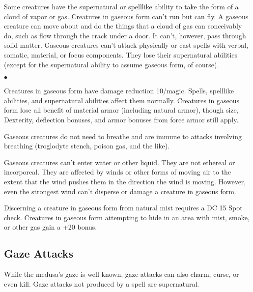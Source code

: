 Some creatures have the supernatural or spell\textendash like ability to take the form of a cloud of vapor or gas.
Creatures in gaseous form can't run but can fly. A gaseous creature can move about and do the things that a cloud of gas can conceivably do, such as flow through the crack under a door. It can't, however, pass through solid matter. Gaseous creatures can't attack physically or cast spells with verbal, somatic, material, or focus components. They lose their supernatural abilities (except for the supernatural ability to assume gaseous form, of course).

\begin{list}{$\bullet$}{\itemspace}
	\item Creatures in gaseous form have damage reduction 10/magic. Spells, spell\textendash like abilities, and supernatural abilities affect them normally. Creatures in gaseous form lose all benefit of material armor (including natural armor), though size, Dexterity, deflection bonuses, and armor bonuses from force armor still apply.
	\item Gaseous creatures do not need to breathe and are immune to attacks involving breathing (troglodyte stench, poison gas, and the like).
	\item Gaseous creatures can't enter water or other liquid. They are not ethereal or incorporeal. They are affected by winds or other forms of moving air to the extent that the wind pushes them in the direction the wind is moving. However, even the strongest wind can't disperse or damage a creature in gaseous form.
	\item Discerning a creature in gaseous form from natural mist requires a DC 15 Spot check. Creatures in gaseous form attempting to hide in an area with mist, smoke, or other gas gain a +20 bonus.
\end{list}
	
\subsection{Gaze Attacks}

While the medusa's gaze is well known, gaze attacks can also charm, curse, or even kill. Gaze attacks not produced by a spell are supernatural.

